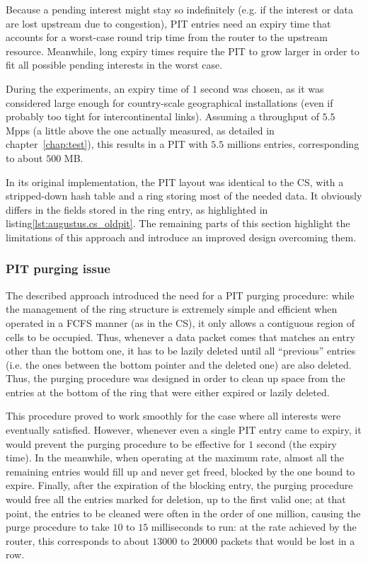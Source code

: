 \documentclass[11pt,a4paper,twoside,titlepage,openany]{book}
\begin{document}
Because a pending interest might stay so indefinitely (e.g. if the interest or data are lost upstream due to congestion), PIT entries need an expiry time that accounts for a worst-case round trip time from the router to the upstream resource. Meanwhile, long expiry times require the PIT to grow larger in order to fit all possible pending interests in the worst case.

During the experiments, an expiry time of $1$ second was chosen, as it was considered large enough for country-scale geographical installations (even if probably too tight for intercontinental links). Assuming a throughput of $5.5$ \gls{Mpps} (a little above the one actually measured, as detailed in chapter~\ref{chap:test}), this results in a PIT with $5.5$ millions entries, corresponding to about $500$ MB.

In its original implementation, the PIT layout was identical to the CS, with a stripped-down hash table and a ring storing most of the needed data. It obviously differs in the fields stored in the ring entry, as highlighted in listing\ref{lst:augustus.cs_oldpit}. The remaining parts of this section highlight the limitations of this approach and introduce an improved design overcoming them.

\subsubsection{PIT purging issue}\label{sec:augustus.pit.purge}
The described approach introduced the need for a PIT purging procedure: while the management of the ring structure is extremely simple and efficient when operated in a FCFS manner (as in the CS), it only allows a contiguous region of cells to be occupied. Thus, whenever a data packet comes that matches an entry other than  the bottom one, it has to be lazily deleted until all ``previous'' entries (i.e. the ones between the bottom pointer and the deleted one) are also deleted.  
Thus, the purging procedure was designed in order to clean up space from the entries at the bottom of the ring that were either expired or lazily deleted.

This procedure proved to work smoothly for the case where all interests were eventually satisfied. However, whenever even a single PIT entry came to expiry, it would prevent the purging procedure to be effective for $1$ second (the expiry time). In the meanwhile, when operating at the maximum rate, almost all the remaining entries would fill up and never get freed, blocked by the one bound to expire. Finally, after the expiration of the blocking entry, the purging procedure would free all the entries marked for deletion, up to the first valid one; at that point, the entries to be cleaned were often in the order of one million, causing the purge procedure to take $10$ to $15$ milliseconds to run: at the rate achieved by the router, this corresponds to about $13000$ to $20000$ packets that would be lost in a row.
\end{document}
